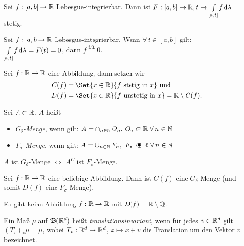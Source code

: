 \documentclass{cheat-sheet}
\newcommand{\Bor}{\mathfrak{B}} %
\newcommand{\fue}{\overset{\text{f.ü.}}} %
\begin{document}
\begin{satz}
  Sei $f : [a, b] \to \mathbb{R}$ Lebesgue-integrierbar. Dann ist $F : [a, b] \to \mathbb{R}, t \mapsto {\textstyle \int\limits_{[a, t]}^{}} f \,\mathrm{d} \lambda$ stetig.
\end{satz}

\begin{satz}
  Sei $f : [a, b \to \mathbb{R}$ Lebesgue-integrierbar. Wenn $\forall\,t \in [a, b]$ gilt: ${\textstyle \int\limits_{[a, t]}^{}} f \,\mathrm{d} \lambda = F(t) = 0$, dann $f \fue= 0$.
\end{satz}

\begin{nota}
  Sei $f : \mathbb{R} \to \mathbb{R}$ eine Abbildung, dann setzen wir
  \begin{align*}
    C(f) &= \Set{ x \in \R }{ f \text{ stetig in } x } \text{ und}\\
    D(f) &= \Set{ x \in \R }{ f \text{ unstetig in } x } = \R \setminus C(f).
  \end{align*}
\end{nota}

\begin{defn}
  Sei $A \subset \mathbb{R}$, $A$ heißt
  \begin{itemize}
    \item \emph{$G_{\delta}$-Menge}, wenn gilt: $A = \cap_{n \in \N}\,O_n, \, O_n \opn \R\ \forall\,n \in \N$
    \item \emph{$F_{\sigma}$-Menge}, wenn gilt: $A = \cup_{n \in \N}\,F_n, \,\, F_n \, \cls \R\ \forall\,n \in \N$
  \end{itemize}
\end{defn}

\begin{bem}
  $A $ ist $G_\delta$-Menge $\iff$ $A^C$ ist $F_\sigma$-Menge.
\end{bem}

\begin{satz}[Young]
  Sei $f : \mathbb{R} \to \mathbb{R}$ eine beliebige Abbildung. Dann ist $C(f)$ eine $G_\delta$-Menge (und somit $D(f)$ eine $F_\sigma$-Menge).
\end{satz}

\begin{kor}
  Es gibt keine Abbildung $f : \mathbb{R} \to \mathbb{R}$ mit $D(f) = \mathbb{R} \setminus \mathbb{Q}$.
\end{kor}

\begin{defn}
  Ein Maß $\mu$ auf $\Bor(\R^d)$ heißt \emph{translationsinvariant}, wenn für jedes $v \in \mathbb{R}^d$ gilt $(T_v)_* \mu = \mu$, wobei $T_v : \mathbb{R}^d \to \mathbb{R}^d$, $x \mapsto x + v$ die Translation um den Vektor $v$ bezeichnet.
\end{defn}
\end{document}
